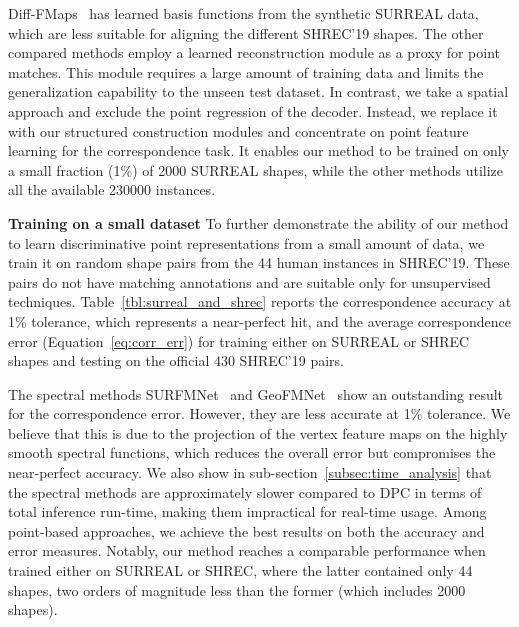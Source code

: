 Diff-FMaps~\cite{marin2020correspondence} has learned basis functions from the synthetic SURREAL data, which are less suitable for aligning the different SHREC'19 shapes. The other compared methods employ a learned reconstruction module as a proxy for point matches. This module requires a large amount of training data and limits the generalization capability to the unseen test dataset. In contrast, we take a spatial approach and exclude the point regression of the decoder. Instead, we replace it with our structured construction modules and concentrate on point feature learning for the correspondence task. It enables our method to be trained on only a small fraction (1\%) of 2000 SURREAL shapes, while the other methods utilize all the available 230000 instances.





\medskip

\noindent \textbf{Training on a small dataset} \quad To further demonstrate the ability of our method to learn discriminative point representations from a small amount of data, we train it on random shape pairs from the 44 human instances in SHREC'19. These pairs do not have matching annotations and are suitable only for unsupervised techniques. Table~\ref{tbl:surreal_and_shrec} reports the correspondence accuracy at 1\% tolerance, which represents a near-perfect hit, and the average correspondence error (Equation~\ref{eq:corr_err}) for training either on SURREAL or SHREC shapes and testing on the official 430 SHREC'19 pairs.





The spectral methods SURFMNet~\cite{roufosse2019unsupervised} and GeoFMNet~\cite{donati2020deep} show an outstanding result for the correspondence error. However, they are less accurate at 1\% tolerance. We believe that this is due to the projection of the vertex feature maps on the highly smooth spectral functions, which reduces the overall error but compromises the near-perfect accuracy. We also show in sub-section~\ref{subsec:time_analysis} that the spectral methods are approximately  slower compared to DPC in terms of total inference run-time, making them impractical for real-time usage. Among point-based approaches, we achieve the best results on both the accuracy and error measures. Notably, our method reaches a comparable performance when trained either on SURREAL or SHREC, where the latter contained only 44 shapes, two orders of magnitude less than the former (which includes 2000 shapes).



